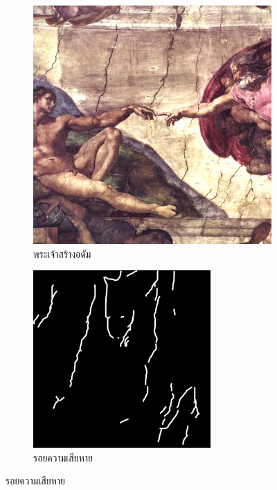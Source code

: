 \documentclass[hidelinks, a4paper,12pt]{article}
\numberwithin{equation}{section}							%
\numberwithin{equation}{section}
\begin{document}
{\begin{figure}[H]
\begin{subfigure}{0.2\linewidth}
		\end{subfigure}
		\begin{subfigure}{0.2\linewidth}
			\centering
			\includegraphics[width=0.8\linewidth]{images/thaiart/Restoration_of_the_Sistine_Chapel_frescoes.png}
			\caption{พระเจ้าสร้างอดัม}
		\end{subfigure}
		\begin{subfigure}{0.2\linewidth}
			\centering
			\includegraphics[width=0.8\linewidth]{images/thaiart/inpaint-domain.png}
			\caption{รอยความเสียหาย}
		\end{subfigure}
	\end{figure}
	
}
\end{document}
